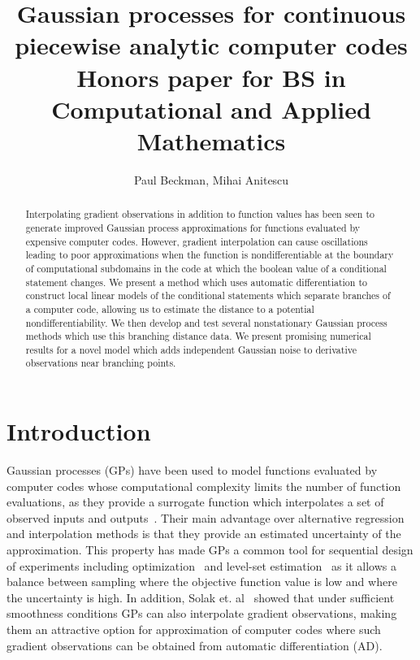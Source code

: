 \documentclass{article}
\title{\textbf{Gaussian processes for continuous piecewise analytic computer codes} \\[1.5ex] \large Honors paper for BS in Computational and Applied Mathematics}
\author{Paul Beckman, Mihai Anitescu}
\date{}
\numberwithin{equation}{section}
\begin{document}
\maketitle
\begin{abstract}
\noindent Interpolating gradient observations in addition to function values has been seen to generate improved Gaussian process approximations for functions evaluated by expensive computer codes. However, gradient interpolation can cause oscillations leading to poor approximations when the function is nondifferentiable at the boundary of computational subdomains in the code at which the boolean value of a conditional statement changes. We present a method which uses automatic differentiation to construct local linear models of the conditional statements which separate branches of a computer code, allowing us to estimate the distance to a potential nondifferentiability. We then develop and test several nonstationary Gaussian process methods which use this branching distance data. We present promising numerical results for a novel model which adds independent Gaussian noise to derivative observations near branching points.
\end{abstract}

\section{Introduction}
Gaussian processes (GPs) have been used to model functions evaluated by computer codes whose computational complexity limits the number of function evaluations, as they provide a surrogate function which interpolates a set of observed inputs and outputs~\cite{sacks1989design}. Their main advantage over alternative regression and interpolation methods is that they provide an estimated uncertainty of the approximation. This property has made GPs a common tool for sequential design of experiments including optimization~\cite{jones1998efficient} and level-set estimation~\cite{ranjan2008sequential} as it allows a balance between sampling where the objective function value is low and where the uncertainty is high. In addition, Solak et. al~\cite{solak2003derivative} showed that under sufficient smoothness conditions GPs can also interpolate gradient observations, making them an attractive option for approximation of computer codes where such gradient observations can be obtained from automatic differentiation (AD).
\end{document}
